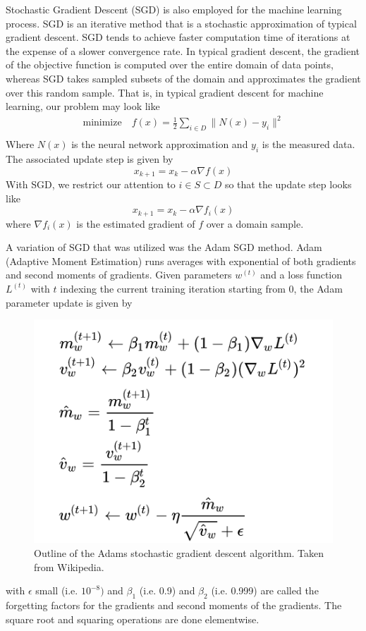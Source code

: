 Stochastic Gradient Descent (SGD) is also employed for the machine learning process. SGD is an iterative method that is a stochastic approximation of typical gradient descent. SGD tends to achieve faster computation time of iterations at the expense of a slower convergence rate. In typical gradient descent, the gradient of the objective function is computed over the entire domain  of data points, whereas SGD takes sampled subsets of the domain and approximates the gradient over this random sample. That is, in typical gradient descent for machine learning, our problem may look like
\begin{align*}
    \text{minimize} \hspace{1em} f(x) = \frac{1}{2}\sum_{i \in D} \|N(x) - y_i \|^2\\
\end{align*}
Where $N(x)$ is the neural network approximation and $y_i$ is the measured data. The associated update step is given by
\[x_{k+1} = x_k - \alpha \nabla f(x)\]
With SGD, we restrict our attention to $i \in S \subset D$ so that the update step looks like
\[x_{k+1} = x_k - \alpha \nabla f_i(x)\]
where $\nabla f_i(x)$ is the estimated gradient of $f$ over a domain sample.
\newline\newline


A variation of SGD that was utilized was the Adam SGD method. Adam (Adaptive Moment Estimation) runs averages with exponential  of both gradients and second moments of gradients. Given parameters $w^{(t)}$ and a loss function $L^{(t)}$ with $t$ indexing the current training iteration starting from 0, the Adam parameter update is given by
\begin{figure}[H]
    \includegraphics[scale = 1]{images/adam.png}
    \centering
    \caption{Outline of the Adams stochastic gradient descent algorithm. Taken from Wikipedia.}
\end{figure}
with $\epsilon$ small (i.e. $10^{-8})$ and $\beta_1$ (i.e. 0.9) and $\beta_2$ (i.e. 0.999) are called the forgetting factors for the gradients and second moments of the gradients. The square root and squaring operations are done elementwise. 